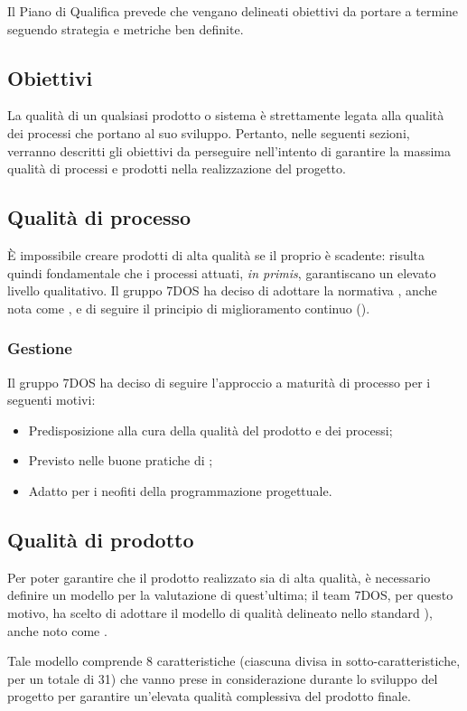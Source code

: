 Il Piano di Qualifica prevede che vengano delineati obiettivi da portare a termine seguendo strategia e metriche ben definite.
\subsection{Obiettivi}
La qualità di un qualsiasi prodotto o sistema è strettamente legata alla qualità dei processi che portano al suo sviluppo. Pertanto, nelle seguenti sezioni, verranno descritti gli obiettivi da perseguire nell'intento di garantire la massima qualità di processi e prodotti nella realizzazione del progetto.
\subsection{Qualità di processo}
	È impossibile creare prodotti di alta qualità se il proprio  è scadente: risulta quindi fondamentale che i processi attuati, \emph{in primis}, garantiscano un elevato livello qualitativo. Il gruppo 7DOS ha deciso di adottare la normativa , anche nota come , e di seguire il principio di miglioramento continuo (). 

\subsubsection{Gestione}
	Il gruppo 7DOS ha deciso di seguire l'approccio a maturità di processo per i seguenti motivi:
	\begin{itemize}
	\item Predisposizione alla cura della qualità del prodotto e dei processi;
	\item Previsto nelle buone pratiche di ;
	\item Adatto per i neofiti della programmazione progettuale.
	\end{itemize}
	
\subsection{Qualità di prodotto}
Per poter garantire che il prodotto realizzato sia di alta qualità, è necessario definire un modello per la valutazione di quest'ultima; il team 7DOS, per questo motivo, ha scelto di adottare il modello di qualità delineato nello standard ), anche noto come .

Tale modello comprende 8 caratteristiche (ciascuna divisa in sotto-caratteristiche, per un totale di 31) che vanno prese in considerazione durante lo sviluppo del progetto per garantire un'elevata qualità complessiva del prodotto finale.

